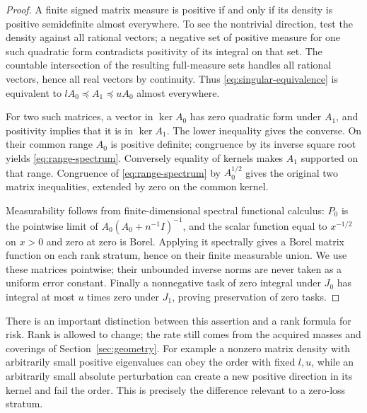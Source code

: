 \begin{proof}
A finite signed matrix measure is positive if and only if its density is positive semidefinite almost everywhere. To see the nontrivial direction, test the density against all rational vectors; a negative set of positive measure for one such quadratic form contradicts positivity of its integral on that set. The countable intersection of the resulting full-measure sets handles all rational vectors, hence all real vectors by continuity. Thus \eqref{eq:singular-equivalence} is equivalent to $lA_0\preccurlyeq A_1\preccurlyeq uA_0$ almost everywhere.

For two such matrices, a vector in $\ker A_0$ has zero quadratic form under $A_1$, and positivity implies that it is in $\ker A_1$. The lower inequality gives the converse. On their common range $A_0$ is positive definite; congruence by its inverse square root yields \eqref{eq:range-spectrum}. Conversely equality of kernels makes $A_1$ supported on that range. Congruence of \eqref{eq:range-spectrum} by $A_0^{1/2}$ gives the original two matrix inequalities, extended by zero on the common kernel.

Measurability follows from finite-dimensional spectral functional calculus: $P_0$ is the pointwise limit of $A_0(A_0+n^{-1}I)^{-1}$, and the scalar function equal to $x^{-1/2}$ on $x>0$ and zero at zero is Borel. Applying it spectrally gives a Borel matrix function on each rank stratum, hence on their finite measurable union. We use these matrices pointwise; their unbounded inverse norms are never taken as a uniform error constant. Finally a nonnegative task of zero integral under $J_0$ has integral at most $u$ times zero under $J_1$, proving preservation of zero tasks.
\end{proof}

There is an important distinction between this assertion and a rank formula for risk. Rank is allowed to change; the rate still comes from the acquired masses and coverings of Section~\ref{sec:geometry}. For example a nonzero matrix density with arbitrarily small positive eigenvalues can obey the order with fixed $l,u$, while an arbitrarily small absolute perturbation can create a new positive direction in its kernel and fail the order. This is precisely the difference relevant to a zero-loss stratum.

